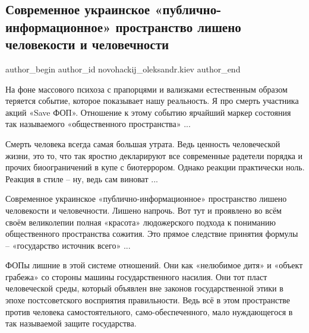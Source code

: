  
 
 
 
 
 
\subsection{Современное украинское «публично-информационное» пространство лишено человекости и человечности}
\label{sec:27_01_2022.fb.novohackij_oleksandr.kiev.1.chelovechnost_save_fop}
 
\ifcmt
 author_begin
   author_id novohackij_oleksandr.kiev
 author_end
\fi

На фоне массового психоза с прапорцями и вализками естественным образом
теряется событие, которое показывает нашу реальность. Я про смерть участника
акций «Save ФОП». Отношение к этому событию ярчайший маркер состояния так
называемого «общественного пространства» ...

Смерть человека всегда самая большая утрата. Ведь ценность человеческой жизни,
это то, что так яростно декларируют все современные радетели порядка и прочих
биоограничений в купе с биотеррором. Однако реакции практически ноль. Реакция в
стиле – ну, ведь сам виноват ...

Современное украинское «публично-информационное» пространство лишено
человекости и человечности. Лишено напрочь. Вот тут и проявлено во всём своём
великолепии полная «красота» людожерского подхода к пониманию общественного
пространства сожития. Это прямое следствие принятия формулы – «государство
источник всего» ...

ФОПы лишние в этой системе отношений. Они как «нелюбимое дитя» и «объект
грабежа» со стороны машины государственного насилия. Они тот пласт человеческой
среды, который объявлен вне законов государственной этики в эпохе
постсоветского восприятия правильности. Ведь всё в этом пространстве против
человека самостоятельного, само-обеспеченного, мало нуждающегося в так
называемой защите государства.

